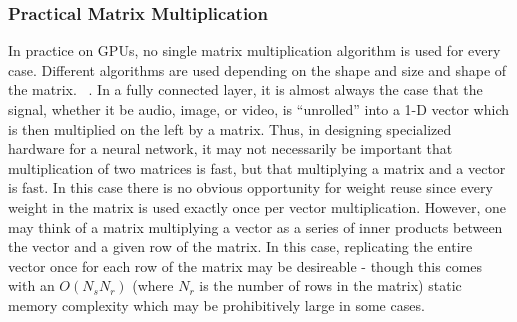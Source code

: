 \subsubsection{Practical Matrix Multiplication}
In practice on GPUs, no single matrix multiplication algorithm is used for every case.  Different algorithms are used depending on the shape and size and shape of the matrix. ~\cite{DBLP:journals/corr/ChetlurWVCTCS14}.  In a fully connected layer, it is almost always the case that the signal, whether it be audio, image, or video, is ``unrolled'' into a 1-D vector which is then multiplied on the left by a matrix.  Thus, in designing specialized hardware for a neural network, it may not necessarily be important that multiplication of two matrices is fast, but that multiplying a matrix and a vector is fast.  In this case there is no obvious opportunity for weight reuse since every weight in the matrix is used exactly once per vector multiplication.  However, one may think of a matrix multiplying a vector as a series of inner products between the vector and a given row of the matrix.  In this case, replicating the entire vector once for each row of the matrix may be desireable - though this comes with an $O(N_s N_r)$ (where $N_r$ is the number of rows in the matrix) static memory complexity which may be prohibitively large in some cases.
